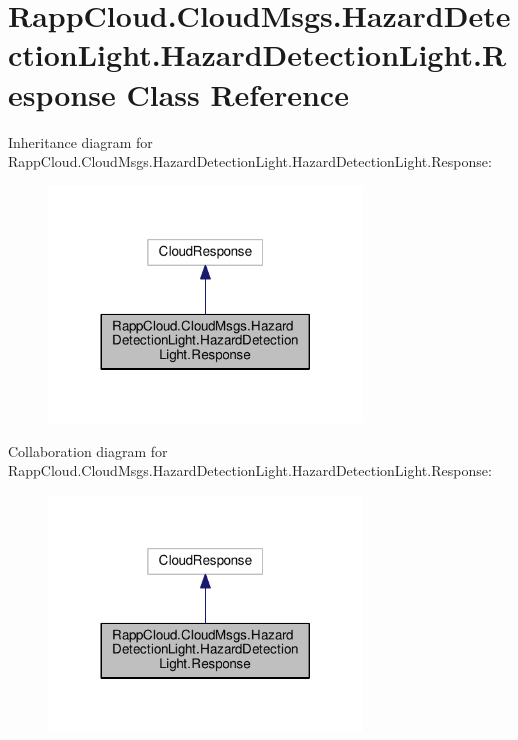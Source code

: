 \hypertarget{classRappCloud_1_1CloudMsgs_1_1HazardDetectionLight_1_1HazardDetectionLight_1_1Response}{\section{Rapp\-Cloud.\-Cloud\-Msgs.\-Hazard\-Detection\-Light.\-Hazard\-Detection\-Light.\-Response Class Reference}
\label{classRappCloud_1_1CloudMsgs_1_1HazardDetectionLight_1_1HazardDetectionLight_1_1Response}
}


Inheritance diagram for Rapp\-Cloud.\-Cloud\-Msgs.\-Hazard\-Detection\-Light.\-Hazard\-Detection\-Light.\-Response\-:
\nopagebreak
\begin{figure}[H]
\begin{center}
\leavevmode
\includegraphics[width=236pt]{classRappCloud_1_1CloudMsgs_1_1HazardDetectionLight_1_1HazardDetectionLight_1_1Response__inherit__graph}
\end{center}
\end{figure}


Collaboration diagram for Rapp\-Cloud.\-Cloud\-Msgs.\-Hazard\-Detection\-Light.\-Hazard\-Detection\-Light.\-Response\-:
\nopagebreak
\begin{figure}[H]
\begin{center}
\leavevmode
\includegraphics[width=236pt]{classRappCloud_1_1CloudMsgs_1_1HazardDetectionLight_1_1HazardDetectionLight_1_1Response__coll__graph}
\end{center}
\end{figure}
